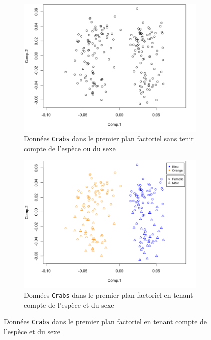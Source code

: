 \documentclass[a4paper,10pt]{report}
\begin{document}
\begin{figure}[H]
	\centering
	\captionsetup{justification=centering, margin=2cm}
	\caption{\small Représentation des données \texttt{Crabs} dans le premier plan factoriel après ACP}
	\begin{subfigure}[b]{0.5\linewidth}
		\centering
		\captionsetup{justification=centering, margin=1cm}
		\includegraphics[width=1\linewidth]{img/1-crabs-acp-premier-plan-factoriel}
		\caption{\scriptsize Données \texttt{Crabs} dans le premier plan factoriel sans tenir compte de l'espèce ou du sexe}
		\label{fig:1-crabs-acp-premier-plan-factoriel}
	\end{subfigure}%
	\begin{subfigure}[b]{0.5\linewidth}
		\centering
		\captionsetup{justification=centering, margin=1cm}
		\includegraphics[width=1\linewidth]{img/1-crabs-acp-premier-plan-factoriel-discr-species-and-sex}
		\caption{\scriptsize Données \texttt{Crabs} dans le premier plan factoriel en tenant compte de l'espèce et du sexe}
		\label{fig:1-crabs-acp-premier-plan-factoriel-discr-species-and-sex}
	\end{subfigure}%
	\label{fig:1-crabs-acp-representation-graphique}%
\end{figure}
\end{document}
